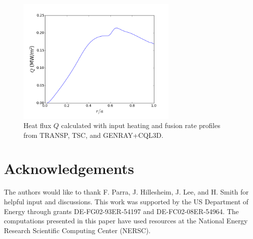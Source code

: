 \documentclass{article}
\numberwithin{figure}{section}
\numberwithin{equation}{section}
\begin{document}
\begin{figure}[h!]
\centering
\includegraphics[width=0.7\textwidth]{turbHeatFlux.png}
\caption{\label{fig:turbHeatFlux} Heat flux $Q$ calculated with input heating and fusion rate profiles from TRANSP, TSC, and GENRAY+CQL3D.}
\end{figure}

\FloatBarrier

\section*{Acknowledgements}
The authors would like to thank F. Parra, J. Hillesheim, J. Lee, and H. Smith for helpful input and discussions. This work was supported by the US Department of Energy through grants DE-FG02-93ER-54197 and DE-FC02-08ER-54964. The computations presented in this paper have used resources at the National Energy Research Scientific Computing Center (NERSC). 


\small

\end{document}
